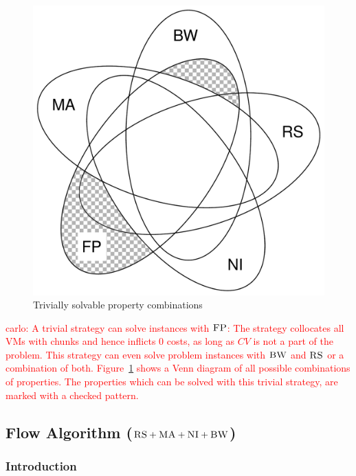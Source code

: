 \documentclass[9pt,twocolumn]{scrartcl}
\newcommand{\Capacity}{\ensuremath{\textsc{cap}}}
\newcommand{\carlo}[1]{\textcolor{red}{carlo: #1}}
\newcommand{\CC}{\textsc{NI}}
\newcommand{\FP}{\textsc{FP}}
\newcommand{\RS}{\textsc{RS}}
\newcommand{\BW}{\textsc{BW}}
\newcommand{\MA}{\textsc{MA}}
\newcommand{\CostTrans}{\ensuremath{b_1}}
\newcommand{\CostCom}{\ensuremath{b_2}}
\begin{document}
\begin{figure}
\includegraphics[width=\columnwidth]{figs/venn_trivial.pdf}
\caption{Trivially solvable property combinations}
\label{fig:venn_trivial}
\end{figure}

\carlo{A trivial strategy can solve instances with $\FP$: The strategy
collocates all VMs with chunks and hence inflicts $0$ costs, as long as $CV$ is
not a part of the problem. This strategy can even solve problem instances with
$\BW$ and $\RS$ or a combination of both. Figure~\ref{fig:venn_trivial}
shows a Venn diagram of all possible combinations of properties. The properties
which can be solved with this trivial strategy, are marked with a checked
pattern.}

\subsection{Flow Algorithm ($\RS+\MA+\CC+\BW$)}

\subsubsection{Introduction}
\end{document}
